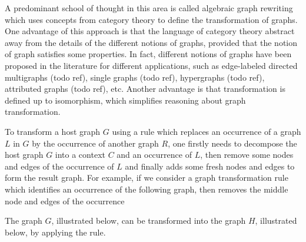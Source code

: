  A predominant school of thought in this area is called algebraic graph rewriting which uses concepts from category theory to define the transformation of graphs. One advantage of this approach is that the language of category theory abstract away from the details of the different notions of graphs, provided that the notion of graph satisfies some properties. In fact, different notions of graphs have been proposed in the literature for different applications, such as edge-labeled directed multigraphs (todo ref), single graphs (todo ref), hypergraphs (todo ref), attributed graphs (todo ref), etc. Another advantage is that transformation is defined up to isomorphism, which simplifies reasoning about graph transformation.

  To transform a host graph $G$ using a rule which replaces an occurrence of a graph $L$ in $G$ by the occurrence of another graph $R$, one firstly needs to decompose the host graph $G$ into a context $C$ and an occurrence of $L$, then remove some nodes and edges of the occurrence of $L$ and finally adds some fresh nodes and edges to form the result graph. For example, if we consider a graph transformation rule which identifies an occurrence of the following graph, then removes the middle node and edges of the occurrence


  The graph $G$, illustrated below, can be transformed into the graph $H$, illustrated below, by applying the rule.

